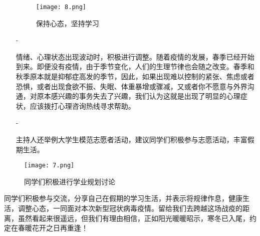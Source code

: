 \documentclass[UTF8]{ctexart}
\begin{document}
\begin{itemize}
		\title{\vspace{1em}}
		\begin{figure}[H]
			\centering
			\begin{center}{}
				\begin{minipage}[t]{4in}
					\texttt{[image: 8.png]}
					\caption*{\kaishu 保持心态，坚持学习}
				\end{minipage}
			\end{center}
		\end{figure}
		\item[-]\par{情绪、心理状态出现波动时，积极进行调整。随着疫情的发展，春季已经开始到来。即便没有疫情，由于季节变化，人们的生理节律也会随之改变。春季和秋季原本就是抑郁症高发的季节，因此，如果出现难以控制的紧张、焦虑或者恐惧，或者出现食欲不振、失眠、体重暴增或骤减，又或者你不愿意与外界沟通，对原本感兴趣的事务失去了兴趣，我们认为这就是出现了明显的心理症状，应该拨打心理咨询热线寻求帮助。}
		\item[-]\par{主持人还举例大学生模范志愿者活动，建议同学们积极参与志愿活动，丰富假期生活。}
	\end{itemize}		
	\title{\vspace{1em}}
	\begin{figure}[H]
		\centering
		\begin{center}{}
			\begin{minipage}[t]{4.5in}
				\texttt{[image: 7.png]}
				\caption*{\kaishu 同学们积极进行学业规划讨论}
			\end{minipage}
		\end{center}
	\end{figure}
	\par{同学们积极参与交流，分享自己在假期的学习生活，并表示将规律作息，健康生活，调整心态，一同面对本次新型冠状病毒疫情。留给我们去跨越这场战疫的距离，虽然看起来很遥远，但我们有理由相信，正如阳光暖暖昭示，寒冬已入尾，约定在春暖花开之日再重逢！}
\end{document}
